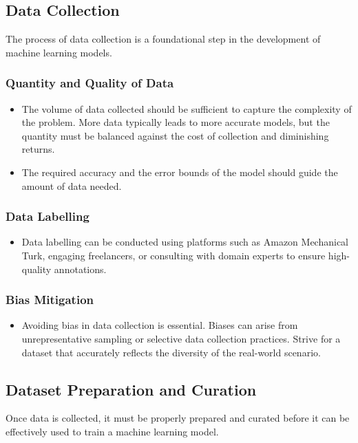 \subsection{Data Collection}

The process of data collection is a foundational step in the development of machine learning models.

\subsubsection*{Quantity and Quality of Data}
\begin{itemize}
    \item The volume of data collected should be sufficient to capture the complexity of the problem. More data typically leads to more accurate models, but the quantity must be balanced against the cost of collection and diminishing returns.
    \item The required accuracy and the error bounds of the model should guide the amount of data needed.
\end{itemize}

\subsubsection*{Data Labelling}
\begin{itemize}
    \item Data labelling can be conducted using platforms such as Amazon Mechanical Turk, engaging freelancers, or consulting with domain experts to ensure high-quality annotations.
\end{itemize}

\subsubsection*{Bias Mitigation}
\begin{itemize}
    \item Avoiding bias in data collection is essential. Biases can arise from unrepresentative sampling or selective data collection practices. Strive for a dataset that accurately reflects the diversity of the real-world scenario.
\end{itemize}

\subsection{Dataset Preparation and Curation}

Once data is collected, it must be properly prepared and curated before it can be effectively used to train a machine learning model.

